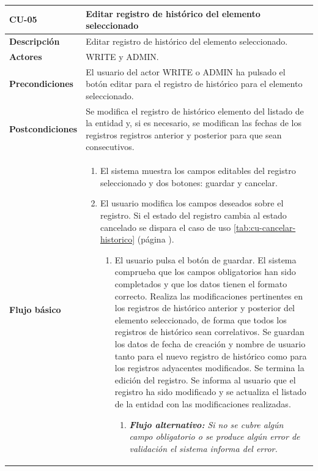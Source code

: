 \begin{table} [H]
    \centering
    \setlength{\leftmargini}{0.4cm}
	\resizebox{14cm}{!} { %
    \begin{tabular}{| m{3cm} | m{11cm} |}   
    \hline
	  \textbf{CU-05} & \textbf{Editar registro de histórico del elemento seleccionado} \\\hline
	  \textbf{Descripción} & Editar registro de histórico del elemento seleccionado. \\\hline
	  \textbf{Actores} & WRITE y ADMIN. \\\hline
	  \textbf{Precondiciones} & El usuario del actor WRITE o ADMIN ha pulsado el botón editar para el registro de histórico para el elemento seleccionado. \\\hline
	  \textbf{Postcondiciones} & Se modifica el registro de histórico elemento del listado de la entidad  y, si es necesario, se modifican las fechas de los registros registros anterior y posterior para que sean consecutivos. \\\hline
	  \textbf{Flujo básico} & 
		\begin{enumerate}
	  	\item El sistema muestra los campos editables del registro seleccionado y dos botones: guardar y cancelar.
        \item El usuario modifica los campos deseados sobre el registro. Si el estado del registro cambia al estado cancelado se dispara el caso de uso \ref{tab:cu-cancelar-historico} (página \pageref{tab:cu-cancelar-historico}).
			\begin{enumerate}	
			   \item El usuario pulsa el botón de guardar. El sistema comprueba que los campos obligatorios han sido completados y que los datos tienen el formato correcto. Realiza las modificaciones pertinentes en los registros de histórico anterior y posterior del elemento seleccionado, de forma que todos los registros de histórico sean correlativos. Se guardan los datos de fecha de creación y nombre de usuario tanto para el nuevo registro de histórico como para los registros adyacentes modificados. Se termina la edición del registro. Se informa al usuario que el registro ha sido modificado y se actualiza el listado de la entidad con las modificaciones realizadas.
			   \begin{enumerate}	
			   \item  \textit{\textbf{Flujo alternativo:} Si no se cubre algún campo obligatorio o se produce algún error de validación el sistema informa del error.}

\end{enumerate}
\end{enumerate}
\end{enumerate}
\end{tabular}}
\end{table}
